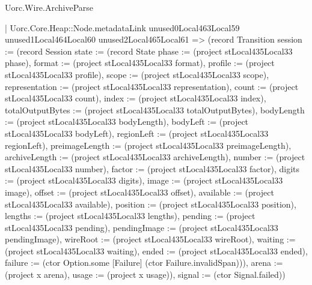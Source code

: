 \begin{lexlean}{Uorc.Wire.ArchiveParse}
\begin{semanticmodule}
{        | Uorc.Core.Heap::Node.metadataLink unused0Local463Local59 unused1Local464Local60 unused2Local465Local61 => (record Transition {session := (record Session {state := (record State {phase := (project stLocal435Local33 phase), format := (project stLocal435Local33 format), profile := (project stLocal435Local33 profile), scope := (project stLocal435Local33 scope), representation := (project stLocal435Local33 representation), count := (project stLocal435Local33 count), index := (project stLocal435Local33 index), totalOutputBytes := (project stLocal435Local33 totalOutputBytes), bodyLength := (project stLocal435Local33 bodyLength), bodyLeft := (project stLocal435Local33 bodyLeft), regionLeft := (project stLocal435Local33 regionLeft), preimageLength := (project stLocal435Local33 preimageLength), archiveLength := (project stLocal435Local33 archiveLength), number := (project stLocal435Local33 number), factor := (project stLocal435Local33 factor), digits := (project stLocal435Local33 digits), image := (project stLocal435Local33 image), offset := (project stLocal435Local33 offset), available := (project stLocal435Local33 available), position := (project stLocal435Local33 position), lengths := (project stLocal435Local33 lengths), pending := (project stLocal435Local33 pending), pendingImage := (project stLocal435Local33 pendingImage), wireRoot := (project stLocal435Local33 wireRoot), waiting := (project stLocal435Local33 waiting), ended := (project stLocal435Local33 ended), failure := (ctor Option.some [Failure] (ctor Failure.invalidSpan))}), arena := (project x arena), usage := (project x usage)}), signal := (ctor Signal.failed)})
}
\end{semanticmodule}
\end{lexlean}
